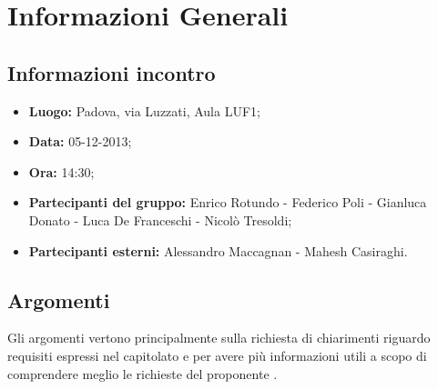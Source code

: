 \section{Informazioni Generali}
	\subsection{Informazioni incontro}
	\begin{itemize}
		\item {\bfseries Luogo:} Padova, via Luzzati, Aula LUF1;
		\item {\bfseries Data:} 05-12-2013;
		\item {\bfseries Ora:} 14:30;
		\item {\bfseries Partecipanti del gruppo:} Enrico Rotundo - Federico Poli - Gianluca Donato - Luca De Franceschi - Nicolò Tresoldi;
		\item {\bfseries Partecipanti esterni:} Alessandro Maccagnan - Mahesh Casiraghi.
	\end{itemize}
	
	\subsection{Argomenti}
		Gli argomenti vertono principalmente sulla richiesta di chiarimenti riguardo requisiti espressi nel capitolato e per avere più informazioni utili a scopo di comprendere meglio le richieste del proponente \Proponente.